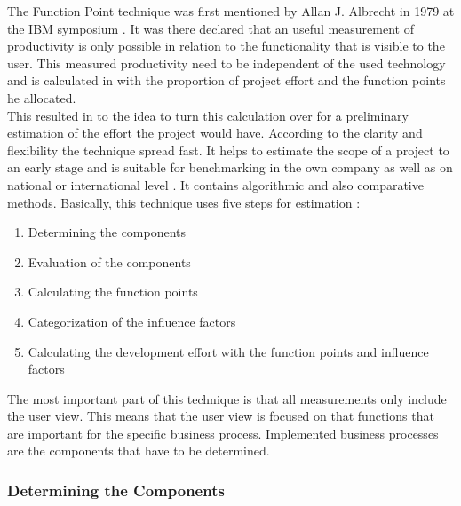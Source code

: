 The Function Point technique was first mentioned by Allan J. Albrecht in 1979 at the IBM symposium \cite{albrecht}. It was there declared that an useful measurement of productivity is only possible in relation to the functionality that is visible to the user. This measured productivity need to be independent of the used technology and is calculated in with the proportion of project effort and the function points he allocated.\\
This resulted in to the idea to turn this calculation over for a preliminary estimation of the effort the project would have. According to the clarity and flexibility the technique spread fast. It helps to estimate the scope of a project to an early stage and is suitable for benchmarking in the own company as well as on national or international level \cite{FPKompakt}. It contains algorithmic and also comparative methods. Basically, this technique uses five steps for estimation \cite{jenny}:
\begin{enumerate}
	\item Determining the components
	\item Evaluation of the components
	\item Calculating the function points
	\item Categorization of the influence factors
	\item Calculating the development effort with the function points and influence factors
\end{enumerate}
The most important part of this technique is that all measurements only include the user view. This means that the user view is focused on that functions that are important for the specific business process. Implemented business processes are the components that have to be determined.

\subsubsection{Determining the Components}

